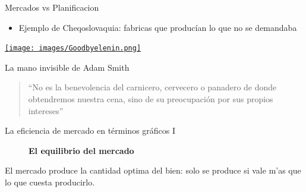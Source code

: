 \documentclass{beamer}
\begin{document}
\begin{frame}{Mercados vs Planificacion}
    
    \begin{itemize}
        \item Ejemplo de Cheqoslovaquia: fabricas que producían lo que no se demandaba
    \end{itemize}

\centering  
    \href{https://www.youtube.com/watch?v=u5hzmwGW4Ac}{
    \texttt{[image: images/Goodbyelenin.png]}}  
    
\end{frame}



    


\begin{frame}{La mano invisible de Adam Smith}
    \begin{quote}
    “No es la benevolencia del carnicero, cervecero o panadero de donde obtendremos nuestra cena, sino de su preocupación por sus propios intereses”
\end{quote}
\end{frame}

\begin{frame}{La eficiencia de mercado en términos gráficos I}
    

\begin{figure} [H]
\centering
{}
\caption{\textbf{El equilibrio del mercado}}
\label{fig:16.1}
\end{figure} 

El mercado produce la cantidad optima del bien: solo se produce si vale m'as que lo que cuesta producirlo.


\end{frame}
\end{document}
